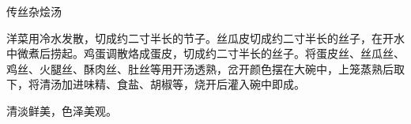 \begin{recipe}{传丝杂烩汤}

\ingredients




\cooking

洋菜用冷水发散，切成约二寸半长的节子。丝瓜皮切成约二寸半长的丝子，在开水中微煮后捞起。鸡蛋调散烙成蛋皮，切成约二寸半长的丝子。将蛋皮丝、丝瓜丝、鸡丝、火腿丝、酥肉丝、肚丝等用开汤透熟，岔开颜色摆在大碗中，上笼蒸熟后取下，将清汤加进味精、食盐、胡椒等，烧开后灌入碗中即成。

\notes

清淡鲜美，色泽美观。

\end{recipe}

